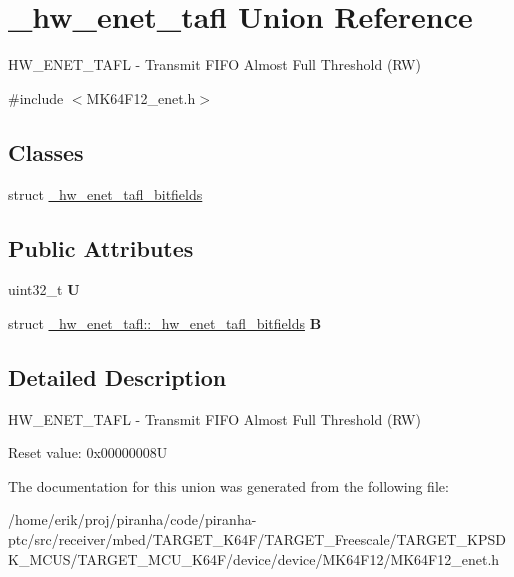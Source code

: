 \hypertarget{union__hw__enet__tafl}{}\section{\+\_\+hw\+\_\+enet\+\_\+tafl Union Reference}
\label{union__hw__enet__tafl}


H\+W\+\_\+\+E\+N\+E\+T\+\_\+\+T\+A\+FL -\/ Transmit F\+I\+FO Almost Full Threshold (RW)  




{\ttfamily \#include $<$M\+K64\+F12\+\_\+enet.\+h$>$}

\subsection*{Classes}
\begin{DoxyCompactItemize}
\item 
struct \hyperlink{struct__hw__enet__tafl_1_1__hw__enet__tafl__bitfields}{\+\_\+hw\+\_\+enet\+\_\+tafl\+\_\+bitfields}
\end{DoxyCompactItemize}
\subsection*{Public Attributes}
\begin{DoxyCompactItemize}
\item 
uint32\+\_\+t {\bfseries U}\hypertarget{union__hw__enet__tafl_ae0c2b05277c934f4e14f5f9174b7ca10}{}\label{union__hw__enet__tafl_ae0c2b05277c934f4e14f5f9174b7ca10}

\item 
struct \hyperlink{struct__hw__enet__tafl_1_1__hw__enet__tafl__bitfields}{\+\_\+hw\+\_\+enet\+\_\+tafl\+::\+\_\+hw\+\_\+enet\+\_\+tafl\+\_\+bitfields} {\bfseries B}\hypertarget{union__hw__enet__tafl_aac58f91d404c0318a51021fdca5d6cb1}{}\label{union__hw__enet__tafl_aac58f91d404c0318a51021fdca5d6cb1}

\end{DoxyCompactItemize}


\subsection{Detailed Description}
H\+W\+\_\+\+E\+N\+E\+T\+\_\+\+T\+A\+FL -\/ Transmit F\+I\+FO Almost Full Threshold (RW) 

Reset value\+: 0x00000008U 

The documentation for this union was generated from the following file\+:\begin{DoxyCompactItemize}
\item 
/home/erik/proj/piranha/code/piranha-\/ptc/src/receiver/mbed/\+T\+A\+R\+G\+E\+T\+\_\+\+K64\+F/\+T\+A\+R\+G\+E\+T\+\_\+\+Freescale/\+T\+A\+R\+G\+E\+T\+\_\+\+K\+P\+S\+D\+K\+\_\+\+M\+C\+U\+S/\+T\+A\+R\+G\+E\+T\+\_\+\+M\+C\+U\+\_\+\+K64\+F/device/device/\+M\+K64\+F12/M\+K64\+F12\+\_\+enet.\+h\end{DoxyCompactItemize}
